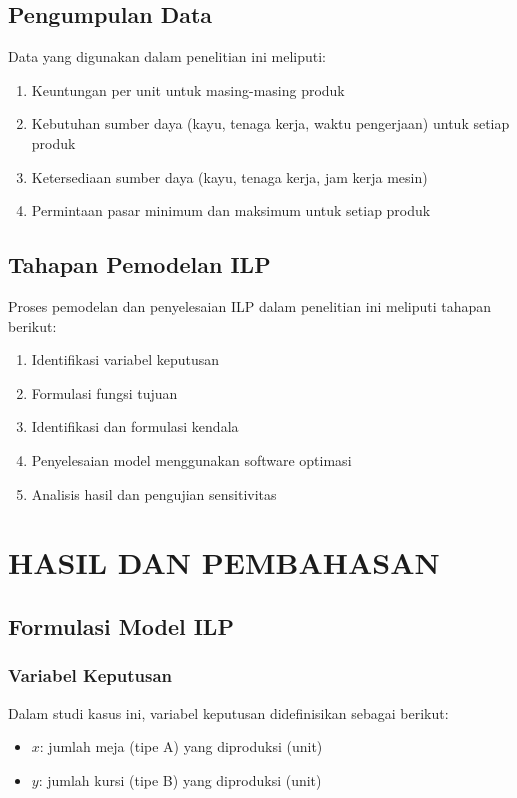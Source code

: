 \documentclass[twocolumn]{article}
\begin{document}
\subsection{Pengumpulan Data}
Data yang digunakan dalam penelitian ini meliputi:
\begin{enumerate}
    \item Keuntungan per unit untuk masing-masing produk
    \item Kebutuhan sumber daya (kayu, tenaga kerja, waktu pengerjaan) untuk setiap produk
    \item Ketersediaan sumber daya (kayu, tenaga kerja, jam kerja mesin)
    \item Permintaan pasar minimum dan maksimum untuk setiap produk
\end{enumerate}

\subsection{Tahapan Pemodelan ILP}
Proses pemodelan dan penyelesaian ILP dalam penelitian ini meliputi tahapan berikut:
\begin{enumerate}
    \item Identifikasi variabel keputusan
    \item Formulasi fungsi tujuan
    \item Identifikasi dan formulasi kendala
    \item Penyelesaian model menggunakan software optimasi
    \item Analisis hasil dan pengujian sensitivitas
\end{enumerate}

\section{HASIL DAN PEMBAHASAN}
\subsection{Formulasi Model ILP}
\subsubsection{Variabel Keputusan}
Dalam studi kasus ini, variabel keputusan didefinisikan sebagai berikut:
\begin{itemize}
    \item $x$: jumlah meja (tipe A) yang diproduksi (unit)
    \item $y$: jumlah kursi (tipe B) yang diproduksi (unit)
\end{itemize}
\end{document}
